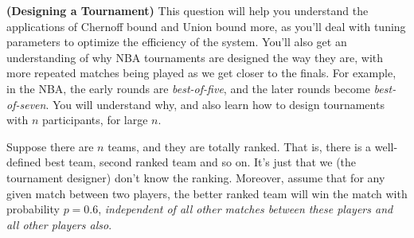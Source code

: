\documentclass[solution,addpoints,12pt]{exam}
\begin{document}
\begin{questions}


\question[15] \textbf{(Designing a Tournament)}  This question will help you understand the applications of Chernoff bound and Union bound more, as you'll deal with tuning parameters to optimize the efficiency of the system. You'll also get an understanding of why NBA tournaments are designed the way they are, with more repeated matches being played as we get closer to the finals. For example, in the NBA, the early rounds are \emph{best-of-five}, and the later rounds become \emph{best-of-seven}. You will understand why, and also learn how to design tournaments with $n$ participants, for large $n$.

Suppose there are $n$ teams, and they are totally ranked. That is, there is a well-defined best team, second ranked team and so on. It's just that we (the tournament designer) don't know the ranking. Moreover, assume that for any given match between two players, the better ranked team will win the match with probability $p = 0.6$, \emph{independent of all other matches between these players and all other players also}. 

\end{questions}
\end{document}
